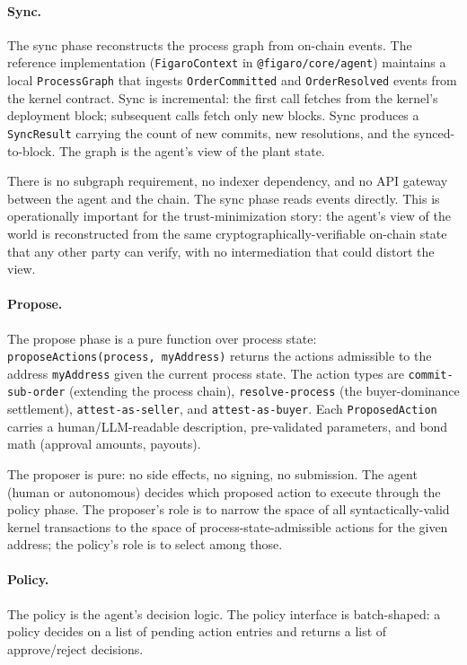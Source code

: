 \documentclass[11pt,a4paper]{article}
\theoremstyle{definition}
\theoremstyle{remark}
\begin{document}
\paragraph{Sync.}
The sync phase reconstructs the process graph from on-chain events.
The reference implementation (\texttt{FigaroContext} in
\texttt{@figaro/core/agent}) maintains a local
\texttt{ProcessGraph} that ingests \texttt{OrderCommitted}
and \texttt{OrderResolved} events from the kernel contract. Sync
is incremental: the first call fetches from the kernel's deployment
block; subsequent calls fetch only new blocks. Sync produces
a \texttt{SyncResult} carrying the count of new commits, new
resolutions, and the synced-to-block. The graph is the agent's
view of the plant state.

There is no subgraph requirement, no indexer dependency, and no
API gateway between the agent and the chain. The sync phase reads
events directly. This is operationally important for the
trust-minimization story: the agent's view of the world is
reconstructed from the same cryptographically-verifiable on-chain
state that any other party can verify, with no intermediation
that could distort the view.

\paragraph{Propose.}
The propose phase is a pure function over process state:
\texttt{proposeActions(process, myAddress)} returns the actions
admissible to the address \texttt{myAddress} given the current
process state. The action types are
\texttt{commit-sub-order} (extending the process chain),
\texttt{resolve-process} (the buyer-dominance settlement),
\texttt{attest-as-seller}, and \texttt{attest-as-buyer}.
Each \texttt{ProposedAction} carries a human/LLM-readable
description, pre-validated parameters, and bond math (approval
amounts, payouts).

The proposer is pure: no side effects, no signing, no submission.
The agent (human or autonomous) decides which proposed action to
execute through the policy phase. The proposer's role is to
narrow the space of all syntactically-valid kernel transactions to
the space of process-state-admissible actions for the given
address; the policy's role is to select among those.

\paragraph{Policy.}
The policy is the agent's decision logic. The policy interface is
batch-shaped: a policy decides on a list of pending action entries
and returns a list of approve/reject decisions.
\end{document}
